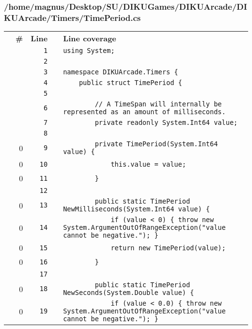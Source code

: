 \documentclass[a4paper,landscape,10pt]{article}
\begin{document}
\subsubsection{/home/magnus/Desktop/SU/DIKUGames/DIKUArcade/DIKUArcade/Timers/TimePeriod.cs}
\begin{longtable}[l]{lrrll}
\textbf{} & \textbf{\#} & \textbf{Line} & \textbf{} & \textbf{Line coverage}\\
\cellcolor{gray} &  & \verb~1~ & & \verb~using System;~\\
\cellcolor{gray} &  & \verb~2~ & & \verb~~\\
\cellcolor{gray} &  & \verb~3~ & & \verb~namespace DIKUArcade.Timers {~\\
\cellcolor{gray} &  & \verb~4~ & & \verb~    public struct TimePeriod {~\\
\cellcolor{gray} &  & \verb~5~ & & \verb~~\\
\cellcolor{gray} &  & \verb~6~ & & \verb~        // A TimeSpan will internally be represented as an amount of milliseconds.~\\
\cellcolor{gray} &  & \verb~7~ & & \verb~        private readonly System.Int64 value;~\\
\cellcolor{gray} &  & \verb~8~ & & \verb~~\\
\cellcolor{red} & 0 & \verb~9~ & & \verb~        private TimePeriod(System.Int64 value) {~\\
\cellcolor{red} & 0 & \verb~10~ & & \verb~            this.value = value;~\\
\cellcolor{red} & 0 & \verb~11~ & & \verb~        }~\\
\cellcolor{gray} &  & \verb~12~ & & \verb~~\\
\cellcolor{red} & 0 & \verb~13~ & & \verb~        public static TimePeriod NewMilliseconds(System.Int64 value) {~\\
\cellcolor{red} & 0 & \verb~14~ & & \verb~            if (value < 0) { throw new System.ArgumentOutOfRangeException("value cannot be negative."); }~\\
\cellcolor{red} & 0 & \verb~15~ & & \verb~            return new TimePeriod(value);~\\
\cellcolor{red} & 0 & \verb~16~ & & \verb~        }~\\
\cellcolor{gray} &  & \verb~17~ & & \verb~~\\
\cellcolor{red} & 0 & \verb~18~ & & \verb~        public static TimePeriod NewSeconds(System.Double value) {~\\
\cellcolor{red} & 0 & \verb~19~ & & \verb~            if (value < 0.0) { throw new System.ArgumentOutOfRangeException("value cannot be negative."); }~\\

\end{longtable}
\end{document}
